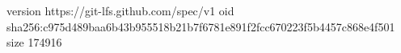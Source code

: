 version https://git-lfs.github.com/spec/v1
oid sha256:c975d489baa6b43b955518b21b7f6781e891f2fcc670223f5b4457c868e4f501
size 174916
